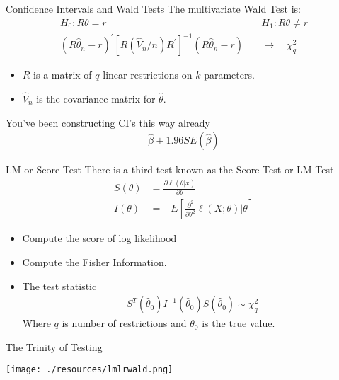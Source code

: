 \begin{frame}{Confidence Intervals and Wald Tests}
The multivariate Wald Test is:
\begin{align*}
H_{0}: R \theta=r \quad &
H_{1}: R \theta \neq r\\
\left(R \hat{\theta}_{n}-r\right)^{\prime}\left[R\left(\hat{V}_{n} / n\right) R^{\prime}\right]^{-1}\left(R \hat{\theta}_{n}-r\right) \quad &\rightarrow \quad \chi_{q}^{2}
\end{align*}
\begin{itemize}
\item $R$ is a matrix of $q$ linear restrictions on $k$ parameters.
\item $\hat{V}_n$ is the covariance matrix for $\widehat{\theta}$.
\end{itemize}
You've been constructing CI's this way already
\begin{align*}
\widehat{\beta} \pm 1.96 SE(\widehat{\beta})
\end{align*}
\end{frame}

\begin{frame}{LM or Score Test}
There is a third test known as the \alert{Score Test} or \alert{LM Test}
\begin{align*}
S(\theta)&=\frac{\partial \ell(\theta | x)}{\partial \theta} \\
I(\theta)&=-E\left[\frac{\partial^{2}}{\partial \theta^{2}} \ell(X ; \theta) | \theta\right]
\end{align*}
\begin{itemize}
\item Compute the \alert{score of log likelihood}
\item Compute the \alert{Fisher Information}.
\item The test statistic\
\begin{align*}
S^{T}\left(\hat{\theta}_{0}\right) I^{-1}\left(\hat{\theta}_{0}\right) S\left(\hat{\theta}_{0}\right) \sim \chi_{q}^{2}
\end{align*}
Where $q$ is number of restrictions and $\theta_0$ is the true value.
\end{itemize}
\end{frame}

\begin{frame}{The Trinity of Testing}
\begin{center}
\texttt{[image: ./resources/lmlrwald.png]}
\end{center}
\end{frame}

